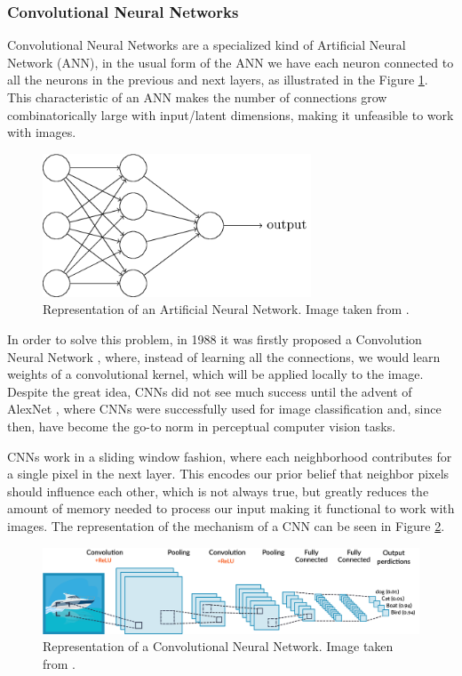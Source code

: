 \subsubsection{Convolutional Neural Networks}

Convolutional Neural Networks are a specialized kind of Artificial Neural Network (ANN), in the usual form of the ANN we have each neuron connected to all the neurons in the previous and next layers, as illustrated in the Figure \ref{ann}. This characteristic of an ANN makes the number of connections grow combinatorically large with input/latent dimensions, making it unfeasible to work with images.

\begin{figure}[H]
    \includegraphics[width=8cm]{Cap2-Methods/rede.png}
    \centering
	\caption{Representation of an Artificial Neural Network. Image taken from \cite{neuralimg}.}
	\label{ann}
\end{figure}

In order to solve this problem, in 1988 it was firstly proposed a Convolution Neural Network \cite{cnn_gordo}, where, instead of learning all the connections, we would learn weights of a convolutional kernel, which will be applied locally to the image. Despite the great idea, CNNs did not see much success until the advent of AlexNet \cite{alex}, where CNNs were successfully used for image classification and, since then, have become the go-to norm in perceptual computer vision tasks. 

CNNs work in a sliding window fashion, where each neighborhood contributes for a single pixel in the next layer. This encodes our prior belief that neighbor pixels should influence each other, which is not always true, but greatly reduces the amount of memory needed to process our input making it functional to work with images. The representation of the mechanism of a CNN can be seen in Figure \ref{cnn}.

\begin{figure}[H]
    \includegraphics[width=\textwidth]{Cap2-Methods/image2.png}
    \centering
	\caption{Representation of a Convolutional Neural Network. Image taken from \cite{cnnimg}.}
	\label{cnn}
\end{figure}

